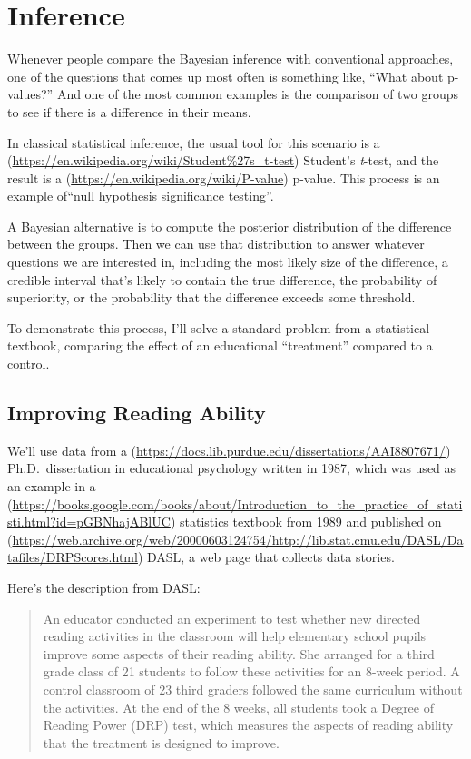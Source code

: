 \documentclass[12pt]{book}
\theoremstyle{exercise}
\begin{document}
\chapter{Inference}

Whenever people compare the Bayesian inference with conventional
approaches, one of the questions that comes up most often is something
like, ``What about p-values?'' And one of the most common examples is
the comparison of two groups to see if there is a difference in their
means.

In classical statistical inference, the usual tool for this scenario is
a (\url{https://en.wikipedia.org/wiki/Student\%27s_t-test}) Student's
\textit{t}-test, and the result is a
(\url{https://en.wikipedia.org/wiki/P-value}) p-value. This process is
an example of``null
hypothesis significance testing''.

A Bayesian alternative is to compute the posterior distribution of the
difference between the groups. Then we can use that distribution to
answer whatever questions we are interested in, including the most
likely size of the difference, a credible interval that's likely to
contain the true difference, the probability of superiority, or the
probability that the difference exceeds some threshold.

To demonstrate this process, I'll solve a standard problem from a
statistical textbook, comparing the effect of an educational
``treatment'' compared to a control.

\section{Improving Reading Ability}

We'll use data from a
(\url{https://docs.lib.purdue.edu/dissertations/AAI8807671/})
Ph.D.~dissertation in educational psychology written in 1987, which was used as an example
in a
(\url{https://books.google.com/books/about/Introduction_to_the_practice_of_statisti.html?id=pGBNhajABlUC})
statistics textbook from 1989 and published on
(\url{https://web.archive.org/web/20000603124754/http://lib.stat.cmu.edu/DASL/Datafiles/DRPScores.html}) DASL,
a web page that collects data stories.

Here's the description from DASL:

\begin{quote}
An educator conducted an experiment to test whether new directed reading
activities in the classroom will help elementary school pupils improve
some aspects of their reading ability. She arranged for a third grade
class of 21 students to follow these activities for an 8-week period. A
control classroom of 23 third graders followed the same curriculum
without the activities. At the end of the 8 weeks, all students took a
Degree of Reading Power (DRP) test, which measures the aspects of
reading ability that the treatment is designed to improve.
\end{quote}
\end{document}
